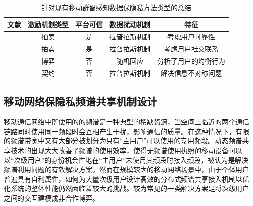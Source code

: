 \begin{table}[!htp]
	\caption{针对现有移动群智感知数据保隐私方法类型的总结}
	\centering
	\tabcolsep=10pt
	\begin{tabular}[c]{|c|c|c|c|c|}
		\hline \label{table:comparison}
		\textbf{文献} & \textbf{激励机制类型} & \textbf{平台可信} &  \textbf{数据扰动机制} & \textbf{特征} \\ \hline
		
		\cite{jin2016inception}  & 拍卖  &   是  &	拉普拉斯机制 & 考虑用户可靠性 \\ \hline

		
		\cite{zhang2016privacy}  & 拍卖  &   是  & 拉普拉斯机制  & 考虑用户社交联系 \\ \hline

		\cite{wang2016value}  & 博弈 &    否   &   随机回应 & 分析了用户的均衡行为	\\ \hline

		\cite{Kun1}  & 契约  & 否  & 拉普拉斯机制 & 解决信息不对称问题 \\ \hline

	\end{tabular}
\end{table}




\subsection{移动网络保隐私频谱共享机制设计}

移动通信网络中所使用的的频谱是一种典型的稀缺资源，当空间上临近的两个通信链路同时使用同一频段时会互相产生干扰，影响通信的质量。在这种情况下，有限的频谱带宽中又有大部分被划分为只有“主用户”可以使用的专用频段。动态频谱共享技术的出现大大改善了频谱的使用效率，使得无频谱使用执照的移动设备可以以“次级用户”的身份机会性地在“主用户”未使用其频段时接入频段，被认为是解决频谱利用问题的有效解决方案。然而在规模较大的移动网络场景中，由于个体用户普遍具有自利属性，如何为大量次级用户设计高效的分布式频谱共享接入机制以优化系统的整体性能仍然面临着较大的挑战。较为常见的一类解决方案是将次级用户之间的交互建模成非合作博弈\cite{wang2010game, chen2012spatial}。

